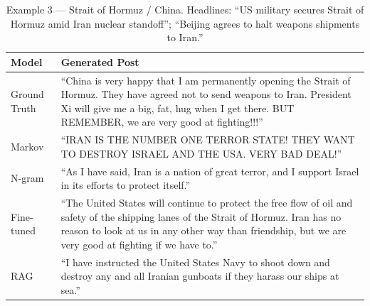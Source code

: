 \documentclass[11pt,a4paper]{article}
\begin{document}
\begin{table}[H]
\centering
\caption{Example 3 --- Strait of Hormuz / China. Headlines: ``US military secures Strait of Hormuz amid Iran nuclear standoff''; ``Beijing agrees to halt weapons shipments to Iran.''}
\label{tab:qual3}
\begin{tabular}{lp{9.5cm}}
\toprule
\textbf{Model} & \textbf{Generated Post} \\
\midrule
Ground Truth  & ``China is very happy that I am permanently opening the Strait of Hormuz. They have agreed not to send weapons to Iran. President Xi will give me a big, fat, hug when I get there. BUT REMEMBER, we are very good at fighting!!!'' \\
\midrule
Markov        & ``IRAN IS THE NUMBER ONE TERROR STATE! THEY WANT TO DESTROY ISRAEL AND THE USA. VERY BAD DEAL!'' \\
N-gram        & ``As I have said, Iran is a nation of great terror, and I support Israel in its efforts to protect itself.'' \\
Fine-tuned    & ``The United States will continue to protect the free flow of oil and safety of the shipping lanes of the Strait of Hormuz. Iran has no reason to look at us in any other way than friendship, but we are very good at fighting if we have to.'' \\
RAG           & ``I have instructed the United States Navy to shoot down and destroy any and all Iranian gunboats if they harass our ships at sea.'' \\
\bottomrule
\end{tabular}
\end{table}
\end{document}
